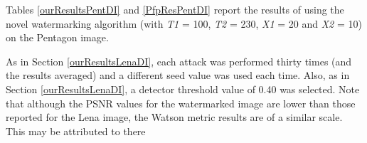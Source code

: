 \documentclass[12pt]{report}
\begin{document}
Tables \ref{ourResultsPentDI} and \ref{PfpResPentDI} report the results of using the novel watermarking algorithm 
(with \emph{T1} = 100, \emph{T2} = 230, \emph{X1} = 20 and \emph{X2} = 10)
on the Pentagon image. 
\begin{table}
\vspace{0.35cm}
\caption{Novel system robustness, using Pentagon image, to various attacks}
\label{ourResultsPentDI}
\end{table}
As in Section \ref{ourResultsLenaDI}, each attack was performed 
thirty times (and the results averaged) and a different seed value was used each time. 
Also, as in Section \ref{ourResultsLenaDI}, a detector
threshold value of 0.40 was selected. 
Note that although the PSNR values for the watermarked image are lower than those
reported for the Lena image, the Watson metric results are of a similar scale. This may be attributed to there
\end{document}
